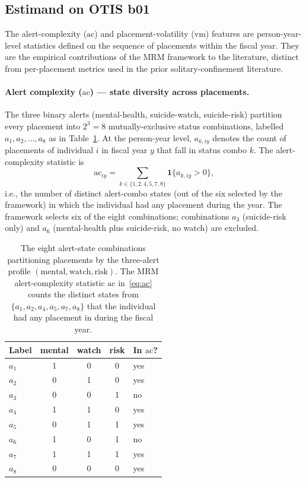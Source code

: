 \documentclass[article,shortnames,nojss]{jss}
\newcommand{\OTIS}{\textsf{OTIS}}
\newcommand{\ac}{\ensuremath{\mathrm{ac}}}
\newcommand{\vm}{\ensuremath{\mathrm{vm}}}
\begin{document}
\subsection[Estimand on OTIS b01]{Estimand on \OTIS{} b01}
\label{sec:methods-estimand}

The alert-complexity ($\ac$) and placement-volatility ($\vm$) features
are person-year-level statistics defined on the sequence of placements
within the fiscal year. They are the empirical contributions of the MRM
framework to the literature, distinct from per-placement metrics used
in the prior solitary-confinement literature.

\paragraph{Alert complexity ($\ac$) --- state diversity across placements.}
The three binary alerts (mental-health, suicide-watch, suicide-risk)
partition every placement into $2^{3} = 8$ mutually-exclusive
status combinations, labelled $a_{1}, a_{2}, \dots, a_{8}$ as in
Table~\ref{tab:status-combos}. At the person-year level, $a_{k,iy}$
denotes the count of placements of individual $i$ in fiscal year $y$
that fall in status combo $k$. The alert-complexity statistic is
\begin{equation}
\label{eq:ac}
  \ac_{iy} = \sum_{k \in \{1,2,4,5,7,8\}} \mathbf{1}\{a_{k,iy} > 0\},
\end{equation}
i.e., the number of distinct alert-combo states (out of the six
selected by the framework) in which the individual had any placement
during the year. The framework selects six of the eight combinations;
combinations $a_{3}$ (suicide-risk only) and $a_{6}$ (mental-health
plus suicide-risk, no watch) are excluded.

\begin{table}[h]
\centering
\caption{The eight alert-state combinations partitioning placements
by the three-alert profile $(\text{mental}, \text{watch}, \text{risk})$.
The MRM alert-complexity statistic $\ac$
in~\eqref{eq:ac} counts the distinct states from $\{a_{1}, a_{2},
a_{4}, a_{5}, a_{7}, a_{8}\}$ that the individual had any placement in
during the fiscal year.}
\label{tab:status-combos}
\small
\begin{tabular}{lccc l}
\toprule
Label & mental & watch & risk & In $\ac$? \\
\midrule
$a_{1}$ & 1 & 0 & 0 & yes \\
$a_{2}$ & 0 & 1 & 0 & yes \\
$a_{3}$ & 0 & 0 & 1 & no  \\
$a_{4}$ & 1 & 1 & 0 & yes \\
$a_{5}$ & 0 & 1 & 1 & yes \\
$a_{6}$ & 1 & 0 & 1 & no  \\
$a_{7}$ & 1 & 1 & 1 & yes \\
$a_{8}$ & 0 & 0 & 0 & yes \\
\bottomrule
\end{tabular}
\end{table}
\end{document}
